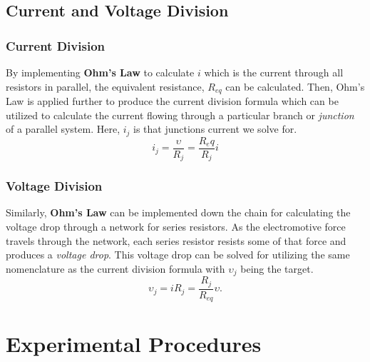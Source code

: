 \documentclass[12pt]{article}
\begin{document}
\subsection{Current and Voltage Division}
\subsubsection{Current Division}
By implementing \textbf{Ohm's Law} to calculate \(i\) which is the current
through all resistors in parallel, the equivalent resistance, \(R_{eq}\) can be
calculated. Then, Ohm's Law is applied further to produce the current division
formula which can be utilized to calculate the current flowing through a
particular branch or \textit{junction} of a parallel system. Here, \(i_j\) is
that junctions current we solve for.
\[
	i_j = \frac{\upsilon}{R_j} = \frac{R_eq}{R_j}i
\]
\subsubsection{Voltage Division}
Similarly, \textbf{Ohm's Law} can be implemented down the chain for calculating
the voltage drop through a network for series resistors. As the electromotive
force travels through the network, each series resistor resists some of that
force and produces a \textit{voltage drop}. This voltage drop can be solved for
utilizing the same nomenclature as the current division formula with
\(\upsilon_j\) being the target.
\[
	\upsilon_j = iR_j = \frac{R_j}{R_{eq}}\upsilon.
\]

\section{Experimental Procedures}
\end{document}
